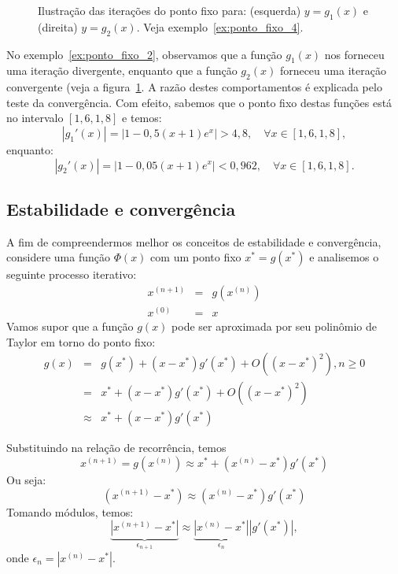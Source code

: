 \begin{figure}[h]
    \caption{Ilustração das iterações do ponto fixo para: (esquerda) $y = g_1(x)$ e (direita) $y = g_2(x)$. Veja exemplo~\ref{ex:ponto_fixo_4}.} \label{fig:teste_de_convergencia}
\end{figure}

\begin{ex}\label{ex:ponto_fixo_4}
  No exemplo~\ref{ex:ponto_fixo_2}, observamos que a função $g_1(x)$ nos forneceu uma iteração divergente, enquanto que a função $g_2(x)$ forneceu uma iteração convergente (veja a figura~\ref{fig:teste_de_convergencia}. A razão destes comportamentos é explicada pelo teste da convergência. Com efeito, sabemos que o ponto fixo destas funções está no intervalo $[1,6, 1,8]$ e temos:
  \begin{equation*}
    |g_1'(x)| = |1 - 0,5(x+1)e^x| > 4,8,\quad\forall x\in [1,6, 1,8],
  \end{equation*}
enquanto:
\begin{equation*}
  |g_2'(x)| = |1 - 0,05(x+1)e^x| < 0,962,\quad\forall x\in [1,6, 1,8].
\end{equation*}
\end{ex}

\subsection{Estabilidade e convergência}

A fim de compreendermos melhor os conceitos de estabilidade e convergência, considere uma função $\Phi(x)$ com um ponto fixo $x^*=g(x^*)$ e analisemos o seguinte processo iterativo:
\begin{eqnarray*}
x^{(n+1)}&=&g\left(x^{(n)}\right)\\
x^{(0)}&=&x
\end{eqnarray*}
Vamos supor que a função $g(x)$ pode ser aproximada por seu polinômio de Taylor em torno do ponto fixo:
\begin{eqnarray*}
g(x)&=&g(x^*)+(x-x^*) g'(x^*)+O\left((x-x^*)^2\right), n\geq 0\\
&=&x^*+(x-x^*) g'(x^*)+O\left((x-x^*)^2\right)\\
&\approx& x^*+(x-x^*) g'(x^*)
\end{eqnarray*}

Substituindo na relação de recorrência, temos
$$
x^{(n+1)}=g\left(x^{(n)}\right)\approx x^*+(x^{(n)}-x^*) g'(x^*)
$$
Ou seja:
$$
\left(x^{(n+1)}-x^*\right)\approx {(x^{(n)}-x^*)} g'(x^*)
$$
Tomando módulos, temos:
$$
\underbrace{\left|x^{(n+1)}-x^*\right|}_{\epsilon_{n+1}}\approx \underbrace{\left|x^{(n)}-x^*\right|}_{\epsilon_n} \left|g'(x^*)\right|,
$$
onde $\epsilon_n=\left|x^{(n)}-x^*\right|$.

